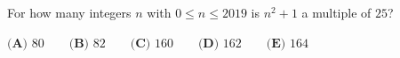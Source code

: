 For how many integers $n$ with $0\le n\le2019$ is $n^2+1$ a multiple of $25$?

$\textbf{(A) }80\qquad\textbf{(B) }82\qquad\textbf{(C) }160\qquad\textbf{(D) }162\qquad\textbf{(E) }164$
